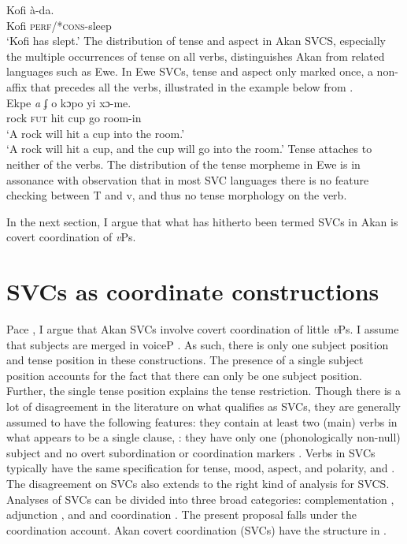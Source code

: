 \documentclass[output=paper,colorlinks,citecolor=brown]{langscibook}
\begin{document}
\ea \label{ex8}
 \gll Kofi à-da.\\
	Kofi \textsc{perf}/*\textsc{cons}-sleep\\
	\glt `Kofi has slept.'
\z The distribution of tense and aspect in Akan SVCS, especially the multiple occurrences of tense on all verbs, distinguishes Akan from related languages such as Ewe. In Ewe SVCs, tense and aspect only marked once, a non-affix that precedes all the verbs, illustrated in the example below from \cite{Collins1997}.
\ea \label{ex0)} 
 \\
\gll Ekpe \textit{a} ʄ o kɔpo yi xɔ-me.\\
rock {\textsc{fut}} hit cup go room-in\\
\glt `A rock will hit a cup into the room.'\\
`A rock will hit a cup, and the cup will go into the room.' 
\z Tense attaches to neither of the verbs. The distribution of the tense morpheme in Ewe is in assonance with  observation that in most SVC languages there is no feature checking between T and v, and thus no tense morphology on the verb.

In the next section, I argue that what has hitherto been termed SVCs in Akan is covert coordination of \emph{v}Ps.

\section{SVCs as coordinate constructions}\label{sec:owusu:3}
Pace \citet{Martin2011}, I argue that Akan SVCs involve covert coordination of little \emph{v}Ps. I assume that subjects are merged in voiceP \citep{Kratzer1996}. As such, there is only one subject position and tense position in these constructions. The presence of a single subject position accounts for the fact that there can only be one subject position.  Further, the single tense position explains the tense restriction. Though there is a lot of disagreement in the literature on what qualifies as SVCs, they are generally assumed to have the following features: they contain at least two (main) verbs in what appears to be a single clause, \citep{Veenstra1993}: they have only one (phonologically non-null) subject and no overt subordination or coordination markers \citep{JansenEtAl1978,Sebba1987}. Verbs in SVCs typically have the same specification for tense, mood, aspect, and polarity, \citep{Baker1989} and \citep{Collins1997}. The disagreement on SVCs also extends to the right kind of analysis for SVCS. Analyses of SVCs can be divided into three broad categories: complementation \citep{Baker1989, BakerStewart2002, Collins1997, Aboh2009}, adjunction \citep{BakerStewart2002}, and and coordination \citep{Agbedor1994}. The present proposal falls under the coordination account. Akan covert coordination (SVCs) have the structure in .
\end{document}
